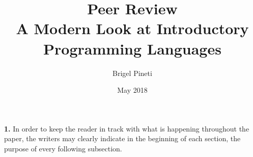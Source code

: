 \documentclass{article}
\title{\Large{Peer Review} \\
    \huge\textbf{{A Modern Look at Introductory Programming Languages}}}
\author{Brigel Pineti}
\date{May 2018}
\begin{document}
    
    \maketitle
    
    \section*{}
    \textbf{1.} In order to keep the reader in track with what is happening throughout the paper, the writers may clearly indicate in the beginning of each section, the purpose of every following subsection.
    
    
\end{document}
